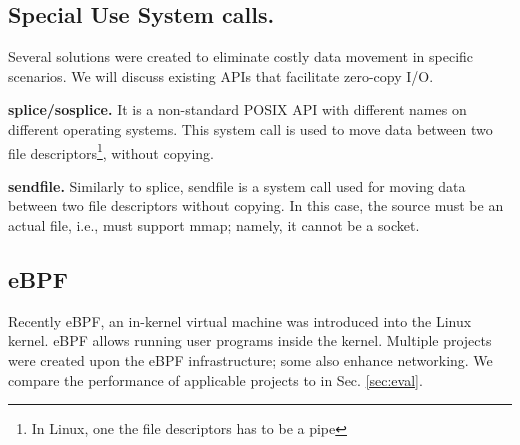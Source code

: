 

\subsection{Special Use System calls.}
Several solutions were created to eliminate costly data movement in specific scenarios. We will discuss existing APIs that facilitate zero-copy I/O.

\noindent\textbf{splice/sosplice\cite{splice,sosplice}.}
It is a non-standard POSIX API with different names on different operating systems. This system call is used to move data between two file descriptors\footnote{In Linux, one the file descriptors has to be a pipe}, without copying. 

\noindent\textbf{sendfile\cite{sendfile}.}
Similarly to splice, sendfile is a system call used for moving data between two file descriptors without copying. In this case, the source must be an actual file, i.e., must support mmap; namely, it cannot be a socket.

\subsection{eBPF}
Recently eBPF\cite{ebpf}, an in-kernel virtual machine was introduced into the Linux kernel. eBPF allows running user programs inside the kernel. Multiple projects\cite{ebpf_2} were created upon the eBPF infrastructure; some also enhance networking. We compare the performance of applicable projects to \oursys in Sec. \ref{sec:eval}.

